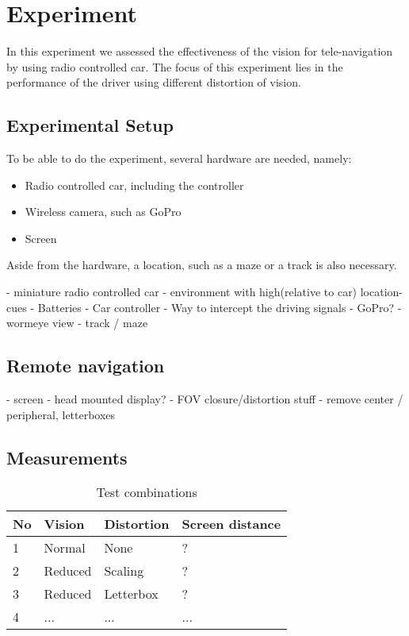 \chapter{Experiment}
In this experiment we assessed the effectiveness of the vision for tele-navigation by using radio controlled car. The focus of this experiment lies in the performance of the driver using different distortion of vision. 

\section{Experimental Setup}
To be able to do the experiment, several hardware are needed, namely:

\begin{itemize}
  \item Radio controlled car, including the controller
  \item Wireless camera, such as GoPro
  \item Screen
\end{itemize}

Aside from the hardware, a location, such as a maze or a track is also necessary. 

- miniature radio controlled car
- environment with high(relative to car) location-cues
- Batteries
- Car controller
- Way to intercept the driving signals
- GoPro?
- wormeye view
- track / maze

\section{Remote navigation}
- screen
- head mounted display?
- FOV closure/distortion stuff
- remove center / peripheral, letterboxes


\section{Measurements}
\begin{table}[h]
\begin{tabular}{|l|lll|}
\hline
No & Vision  & Distortion & Screen distance \\\hline
1  & Normal  & None              & ?               \\
2  & Reduced & Scaling           & ?               \\
3  & Reduced & Letterbox           & ?               \\
4  & ...     & ...               & ...             \\\hline
\end{tabular}
\caption{Test combinations}
\end{table}


